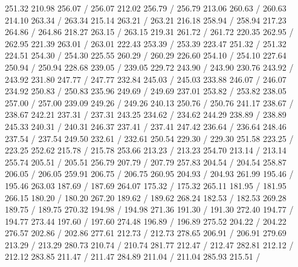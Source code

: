 { 251.32 210.98 256.07 /
 256.07 212.02 256.79 /
 256.79 213.06 260.63 /
 260.63 214.10 263.34 /
 263.34 215.14 263.21 /
 263.21 216.18 258.94 /
 258.94 217.23 264.86 /
 264.86 218.27 263.15 /
 263.15 219.31 261.72 /
 261.72 220.35 262.95 /
 262.95 221.39 263.01 /
 263.01 222.43 253.39 /
 253.39 223.47 251.32 /
 251.32 224.51 254.30 /
 254.30 225.55 260.29 /
 260.29 226.60 254.10 /
 254.10 227.64 250.94 /
 250.94 228.68 239.05 /
 239.05 229.72 243.90 /
 243.90 230.76 243.92 /
 243.92 231.80 247.77 /
 247.77 232.84 245.03 /
 245.03 233.88 246.07 /
 246.07 234.92 250.83 /
 250.83 235.96 249.69 /
 249.69 237.01 253.82 /
 253.82 238.05 257.00 /
 257.00 239.09 249.26 /
 249.26 240.13 250.76 /
 250.76 241.17 238.67 /
 238.67 242.21 237.31 /
 237.31 243.25 234.62 /
 234.62 244.29 238.89 /
 238.89 245.33 240.31 /
 240.31 246.37 237.41 /
 237.41 247.42 236.64 /
 236.64 248.46 237.54 /
 237.54 249.50 232.61 /
 232.61 250.54 229.30 /
 229.30 251.58 223.25 /
 223.25 252.62 215.78 /
 215.78 253.66 213.23 /
 213.23 254.70 213.14 /
 213.14 255.74 205.51 /
 205.51 256.79 207.79 /
 207.79 257.83 204.54 /
 204.54 258.87 206.05 /
 206.05 259.91 206.75 /
 206.75 260.95 204.93 /
 204.93 261.99 195.46 /
 195.46 263.03 187.69 /
 187.69 264.07 175.32 /
 175.32 265.11 181.95 /
 181.95 266.15 180.20 /
 180.20 267.20 189.62 /
 189.62 268.24 182.53 /
 182.53 269.28 189.75 /
 189.75 270.32 194.98 /
 194.98 271.36 191.30 /
 191.30 272.40 194.77 /
 194.77 273.44 197.60 /
 197.60 274.48 196.89 /
 196.89 275.52 204.22 /
 204.22 276.57 202.86 /
 202.86 277.61 212.73 /
 212.73 278.65 206.91 /
 206.91 279.69 213.29 /
 213.29 280.73 210.74 /
 210.74 281.77 212.47 /
 212.47 282.81 212.12 /
 212.12 283.85 211.47 /
 211.47 284.89 211.04 /
 211.04 285.93 215.51 /
}
